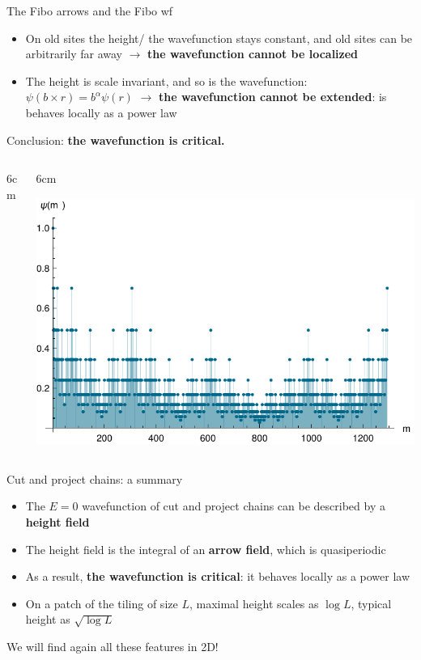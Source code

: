 \documentclass[xcolor=x11names,compress,professionalfonts]{beamer}
\renewcommand{\(}{\begin{columns}}
\renewcommand{\)}{\end{columns}}
\newcommand{\<}[1]{\begin{column}{#1}}
\renewcommand{\>}{\end{column}}
\begin{document}
\begin{frame}{The Fibo arrows and the Fibo wf}
\begin{itemize}
	\item On old sites the height/ the wavefunction stays constant, and old sites can be arbitrarily far away $\rightarrow$ \textbf{the wavefunction cannot be localized}
	\item The height is scale invariant, and so is the wavefunction: $\psi(b \times r) = b^\alpha \psi(r) $ $\rightarrow$ \textbf{the wavefunction cannot be extended}: is behaves locally as a power law
\end{itemize}
Conclusion: \textbf{the wavefunction is critical.}
\begin{columns}
\<{6cm}
\centering

\>

\<{6cm}
{\centering
\includegraphics[scale=.5]{img/wavefunction.pdf}

}
\>
\end{columns}
\end{frame}

\begin{frame}{Cut and project chains: a summary}
\begin{itemize}
	\item The $E=0$ wavefunction of cut and project chains can be described by a \textbf{height field}
	\item The height field is the integral of an \textbf{arrow field}, which is quasiperiodic
	\item As a result, \textbf{the wavefunction is critical}: it behaves locally as a power law
	\item On a patch of the tiling of size $L$, maximal height scales as $\log L$, typical height as $\sqrt{\log L}$
\end{itemize}
We will find again all these features in 2D!
\end{frame}
\end{document}
